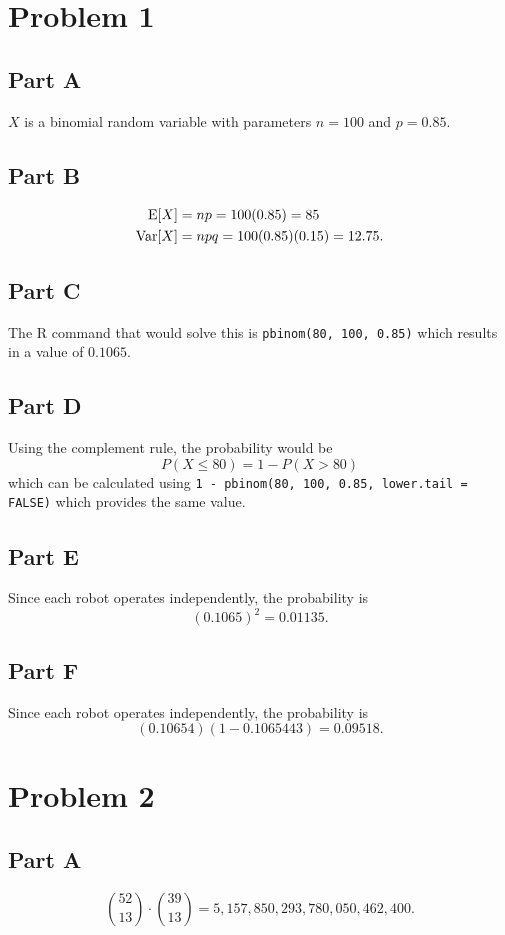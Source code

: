 \documentclass[12pt]{extarticle}
\newcommand{\Exp}[1]{\mathrm{E}\qty[#1]}
\newcommand{\Var}[1]{\mathrm{Var}\qty[#1]}
\begin{document}
\section*{Problem 1}
\subsection*{Part A}
$X$ is a binomial random variable with parameters $n = 100$ and $p = 0.85$.

\subsection*{Part B}
\begin{align*}
	\Exp{X} &= np = 100(0.85) = 85 \\
	\Var{X} &= npq = 100(0.85)(0.15) = 12.75
.\end{align*}

\subsection*{Part C}
The R command that would solve this is \verb|pbinom(80, 100, 0.85)| which results in a value of $0.1065$.

\subsection*{Part D}
Using the complement rule, the probability would be 
\[
	P(X \leq 80) = 1 - P(X > 80)
\]
which can be calculated using \verb|1 - pbinom(80, 100, 0.85, lower.tail = FALSE)| which provides the same value.

\subsection*{Part E}
Since each robot operates independently, the probability is
\[
	(0.1065)^2 = 0.01135
.\]

\subsection*{Part F}
Since each robot operates independently, the probability is
\[
	(0.10654)(1 - 0.1065443) = 0.09518
.\]

\section*{Problem 2}
\subsection*{Part A}
\[
	\binom{52}{13}\cdot \binom{39}{13} = 5,157,850,293,780,050,462,400
.\]
\end{document}
